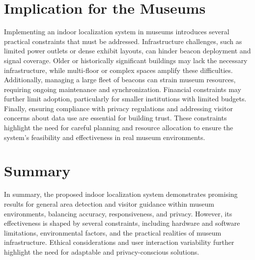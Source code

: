 
 \section{Implication for the Museums}
 Implementing an indoor localization system in museums introduces several practical constraints that must be addressed. Infrastructure challenges, such as limited power outlets or dense exhibit layouts, can hinder beacon deployment and signal coverage. Older or historically significant buildings may lack the necessary infrastructure, while multi-floor or complex spaces amplify these difficulties. Additionally, managing a large fleet of beacons can strain museum resources, requiring ongoing maintenance and synchronization. Financial constraints may further limit adoption, particularly for smaller institutions with limited budgets. Finally, ensuring compliance with privacy regulations and addressing visitor concerns about data use are essential for building trust. These constraints highlight the need for careful planning and resource allocation to ensure the system’s feasibility and effectiveness in real museum environments.

\section{Summary}
In summary, the proposed indoor localization system demonstrates promising results for general area detection and visitor guidance within museum environments, balancing accuracy, responsiveness, and privacy. However, its effectiveness is shaped by several constraints, including hardware and software limitations, environmental factors, and the practical realities of museum infrastructure. Ethical considerations and user interaction variability further highlight the need for adaptable and privacy-conscious solutions. 
